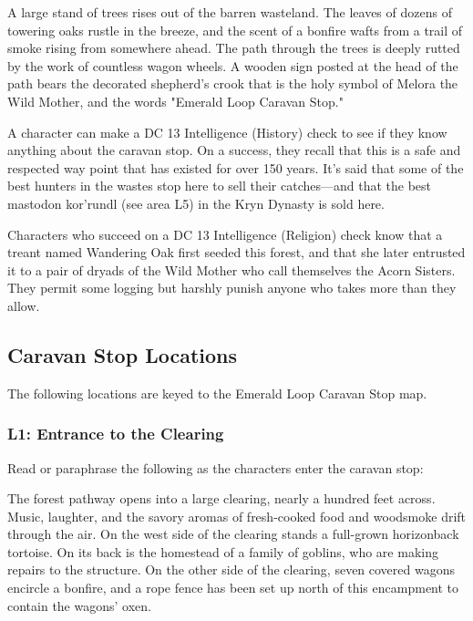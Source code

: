 \documentclass[letterpaper, 11pt, bg=full, twocolumn]{dndbook}
\begin{document}
\begin{DndReadAloud}
A large stand of trees rises out of the barren wasteland. The leaves of dozens of towering oaks rustle in the breeze, and the scent of a bonfire wafts from a trail of smoke rising from somewhere ahead. The path through the trees is deeply rutted by the work of countless wagon wheels. A wooden sign posted at the head of the path bears the decorated shepherd's crook that is the holy symbol of Melora the Wild Mother, and the words "Emerald Loop Caravan Stop."
\end{DndReadAloud}

A character can make a DC 13 Intelligence (History) check to see if they know anything about the caravan stop. On a success, they recall that this is a safe and respected way point that has existed for over 150 years. It's said that some of the best hunters in the wastes stop here to sell their catches---and that the best mastodon kor'rundl (see area L5) in the Kryn Dynasty is sold here.

Characters who succeed on a DC 13 Intelligence (Religion) check know that a treant named Wandering Oak first seeded this forest, and that she later entrusted it to a pair of dryads of the Wild Mother who call themselves the Acorn Sisters. They permit some logging but harshly punish anyone who takes more than they allow.

\subsection{Caravan Stop Locations}

The following locations are keyed to the Emerald Loop Caravan Stop map.



\subsubsection{L1: Entrance to the Clearing}

Read or paraphrase the following as the characters enter the caravan stop:

\begin{DndReadAloud}
The forest pathway opens into a large clearing, nearly a hundred feet across. Music, laughter, and the savory aromas of fresh-cooked food and woodsmoke drift through the air. On the west side of the clearing stands a full-grown horizonback tortoise. On its back is the homestead of a family of goblins, who are making repairs to the structure. On the other side of the clearing, seven covered wagons encircle a bonfire, and a rope fence has been set up north of this encampment to contain the wagons' oxen.
\end{DndReadAloud}
\end{document}
